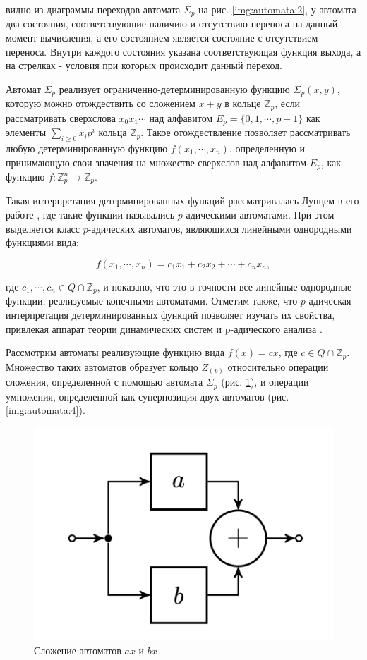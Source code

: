 \documentclass[och, master]{SCWorks}
\theoremstyle{plain}
\theoremstyle{plain}
\theoremstyle{plain}
\theoremstyle{definition}
\begin{document}
 видно из диаграммы переходов автомата $\Sigma_p$ на рис. \ref{img:automata:2}, у автомата два состояния, соответствующие наличию и отсутствию переноса на данный момент вычисления, а  его состоянием является состояние с отсутствием переноса. Внутри каждого состояния указана соответствующая функция выхода, а на стрелках - условия при которых происходит данный переход. 

Автомат $\Sigma_p$ реализует ограниченно-детерминированную функцию $\Sigma_p(x,y)$, которую можно отождествить со сложением $x+y$ в кольце $\mathbb Z_p$, если рассматривать сверхслова $x_0x_1\cdots$ над алфавитом $E_p=\{0,1,\cdots, p-1\}$ как элементы $\sum_{i \ge 0} x_ip^i$ кольца $\mathbb Z_p$. Такое отождествление позволяет рассматривать любую детерминированную функцию $f(x_1,\cdots, x_n)$, определенную и принимающую свои значения на множестве сверхслов над алфавитом $E_p$, как функцию $f: \mathbb {Z}^{n}_{p} \rightarrow \mathbb {Z}_p$.


Такая интерпретация детерминированных функций рассматривалась Лунцем в его работе \cite{bib:automata:lunz}, где такие функции назывались $p$-адическими автоматами. При этом выделяется класс $p$-адических автоматов, являющихся линейными однородными функциями вида:

$$ f(x_1, \cdots, x_n) = c_1x_1 + c_2x_2 + \cdots + c_n x_n,$$

\noindent где $c_1, \cdots, c_n \in Q \cap \mathbb Z_p$, и показано, что это в точности все линейные однородные функции, реализуемые конечными автоматами. Отметим также, что $p$-адическая интерпретация детерминированных функций позволяет изучать их свойства, привлекая
аппарат теории динамических систем \cite{bib:dynamics:anashin} и p-адического анализа \cite{bib:analisys:anashin}.

Рассмотрим автоматы реализующие функцию вида $f(x)=cx$, где $c \in Q \cap \mathbb Z_p$. Множество таких автоматов образует кольцо $Z_{(p)}$ относительно операции сложения, определенной с помощью автомата $\Sigma_p$ (рис. \ref{img:automata:3}), и операции умножения, определенной как суперпозиция двух автоматов (рис.\ref{img:automata:4}). 

\begin{figure}[H]
\centerline{\includegraphics[width=0.5\linewidth]{img/automata_3}}
\caption{Сложение автоматов $ax$ и $bx$}
\label{img:automata:3}
\end{figure}
\end{document}
